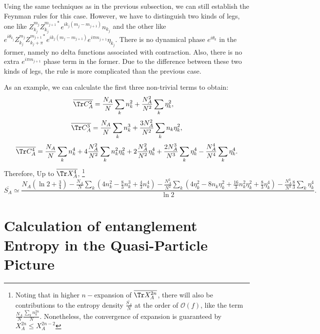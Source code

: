 Using the same techniques as in the previous subsection, we can still
establish the Feynman rules for this case. However, we have to distinguish
two kinds of legs, one like %
$Z_{k_{j}}^{m_{j}}Z_{k_{j}}^{m_{j+1}*}e^{ik_{j}(m_{j}-m_{j+1})}n_{k_{j}}$
and the other like %
$e^{i\theta_{k_{j}}}Z_{k_{j}}^{m_{j}}Z_{k_{j}+\pi}^{m_{j+1}*}e^{ik_{j}(m_{j}-m_{j+1})}e^{i\pi m_{j+1}}\eta_{k_{j}}$.
There is no dynamical phase $e^{i\theta_{k}}$ in the former, namely no delta functions associated with contraction. Also, there is no extra $e^{i\pi m_{j+1}}$ phase term in the former.
Due to the difference between these two kinds of legs, the rule is more complicated than the previous case. 

As an example, we can calculate the first three non-trivial terms to obtain:
\begin{align*}
\overline{\Tr C_{A}^{2}} & =\frac{N_{A}}{N}\sum_{k}n_{k}^{2}+\frac{N_{A}^{2}}{N^{2}}\sum_{k}\eta_{k}^{2},
\end{align*}
\[
\overline{\Tr C_{A}^{3}}=\frac{N_{A}}{N}\sum_{k}n_{k}^{3}+\frac{3N_{A}^{2}}{N^{2}}\sum_{k}n_{k}\eta_{k}^{2},
\]
\[
\overline{\Tr C_{A}^{4}}=\frac{N_{A}}{N}\sum_{k}n_{k}^{4}+4\frac{N_{A}^{2}}{N^{2}}\sum_{k}n_{k}^{2}\eta_{k}^{2}+2\frac{N_{A}^{2}}{N^{2}}\eta_{k}^{4}+\frac{2N_{A}^{3}}{N^{3}}\sum_{k}\eta_{k}^{4}-\frac{N_{A}^{4}}{N^{4}}\sum_{k}\eta_{k}^{4}.
\]
Therefore,  Up to $\overline{\Tr X_{A}^{4}}$, \footnote{Noting that in higher $n-$expansion of $\overline{\Tr X_{A}^{2n}}$, there
will also be contributions to the entropy density $\frac{\overline{S_A}}{N}$ at the order of $\mathcal{O}(f)$, like the term $\frac{N_{A}}{N}\frac{\sum_k n_{k}^{2n}}{N}$. Nonetheless, the convergence of expansion is guaranteed by $X_A^{2n}\leq X_A^{2n-2}$}
\[\overline{S_{A}}\simeq\frac{N_{A}(\ln2+\frac{3}{4})-\frac{N_{A}}{N}\sum_{k}(4n_{k}^{2}-\frac{8}{3}n_{k}^{3}+\frac{4}{3}n_{k}^{4})-\frac{N_{A}^{2}}{N^{2}}\sum_{k}(4\eta_{k}^{2}-8n_{k}\eta_{k}^{2}+\frac{16}{3}n_{k}^{2}\eta_{k}^{2}+\frac{8}{3}\eta_{k}^{4})-\frac{N_{A}^{3}}{N^{3}}\frac{8}{3}\sum_{k}\eta_{k}^{4}}{\ln2}.
\]

\section{Calculation of entanglement Entropy in the Quasi-Particle Picture}

